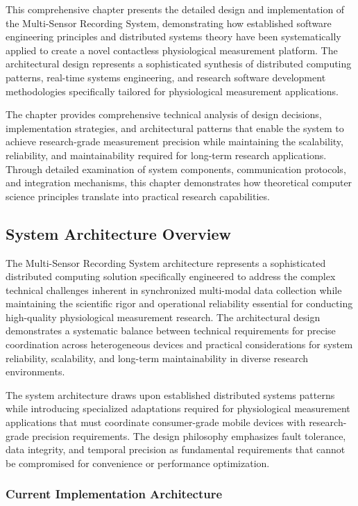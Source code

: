 \documentclass[12pt,a4paper]{report}
\begin{document}
This comprehensive chapter presents the detailed design and implementation of the Multi-Sensor Recording System,
demonstrating how established software engineering principles and distributed systems theory have been systematically
applied to create a novel contactless physiological measurement platform. The architectural design represents a
sophisticated synthesis of distributed computing patterns, real-time systems engineering, and research software
development methodologies specifically tailored for physiological measurement applications.

The chapter provides comprehensive technical analysis of design decisions, implementation strategies, and architectural
patterns that enable the system to achieve research-grade measurement precision while maintaining the scalability,
reliability, and maintainability required for long-term research applications. Through detailed examination of system
components, communication protocols, and integration mechanisms, this chapter demonstrates how theoretical computer
science principles translate into practical research capabilities.

\subsection{System Architecture Overview}

The Multi-Sensor Recording System architecture represents a sophisticated distributed computing solution specifically
engineered to address the complex technical challenges inherent in synchronized multi-modal data collection while
maintaining the scientific rigor and operational reliability essential for conducting high-quality physiological
measurement research. The architectural design demonstrates a systematic balance between technical requirements for
precise coordination across heterogeneous devices and practical considerations for system reliability, scalability, and
long-term maintainability in diverse research environments.

The system architecture draws upon established distributed systems patterns while introducing specialized adaptations
required for physiological measurement applications that must coordinate consumer-grade mobile devices with
research-grade precision requirements. The design philosophy emphasizes fault tolerance, data integrity, and temporal
precision as fundamental requirements that cannot be compromised for convenience or performance optimization.

\subsubsection{Current Implementation Architecture}
\end{document}
